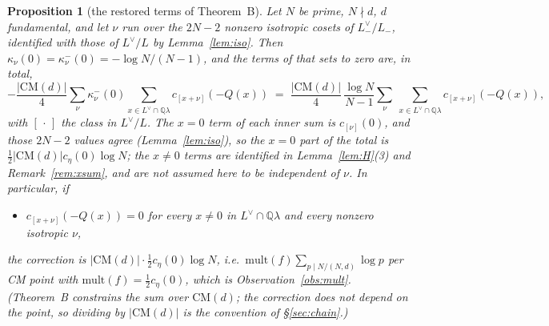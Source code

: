 \documentclass[11pt,reqno]{amsart}
\theoremstyle{plain}
\newtheorem{proposition}[theorem]{Proposition}
\theoremstyle{definition}
\newcommand{\Q}{\mathbb{Q}}
\newcommand{\Ldual}{L^{\vee}}
\newcommand{\Lm}{L_{-}}
\begin{document}
\begin{proposition}[the restored terms of Theorem~B]\label{prop:mult}
Let $N$ be prime, $N\nmid d$, $d$ fundamental, and let $\nu$ run over the $2N-2$ nonzero isotropic
cosets of $\Lm^\vee/\Lm$, identified with those of $\Ldual/L$ by Lemma~\ref{lem:iso}. Then
$\kappa_\nu(0)=\kappa^-_\nu(0)=-\log N/(N-1)$, and the terms of \cite[Thm.~B]{GY} that
\cite[(11)]{Yang} sets to zero are, in total,
\[
  -\frac{\lvert\mathrm{CM}(d)\rvert}{4}\sum_{\nu}\kappa^-_\nu(0)
     \sum_{x\in\Ldual\cap\Q\lambda}c_{[x+\nu]}(-Q(x))
  \;=\;\frac{\lvert\mathrm{CM}(d)\rvert}{4}\,\frac{\log N}{N-1}
     \sum_{\nu}\ \sum_{x\in\Ldual\cap\Q\lambda}c_{[x+\nu]}(-Q(x)),
\]
with $[\,\cdot\,]$ the class in $\Ldual/L$. The $x=0$ term of each inner sum is $c_{[\nu]}(0)$, and
those $2N-2$ values agree (Lemma~\ref{lem:iso}), so the $x=0$ part of the total is
$\tfrac12\lvert\mathrm{CM}(d)\rvert c_\eta(0)\log N$; the $x\neq0$ terms are identified in
Lemma~\ref{lem:H}(3) and Remark~\ref{rem:xsum}, and are not assumed here to be independent of
$\nu$. In particular, if
\begin{itemize}
\item[(H)] $c_{[x+\nu]}(-Q(x))=0$ for every $x\neq0$ in $\Ldual\cap\Q\lambda$ and every nonzero
      isotropic $\nu$,
\end{itemize}
the correction is $\lvert\mathrm{CM}(d)\rvert\cdot\tfrac12c_\eta(0)\log N$, i.e.\
$\mathrm{mult}(f)\sum_{p\mid N/(N,d)}\log p$ per CM point with $\mathrm{mult}(f)=\tfrac12c_\eta(0)$,
which is Observation~\ref{obs:mult}. (Theorem~B constrains the sum over $\mathrm{CM}(d)$; the
correction does not depend on the point, so dividing by $\lvert\mathrm{CM}(d)\rvert$ is the
convention of \S\ref{sec:chain}.)
\end{proposition}
\end{document}
